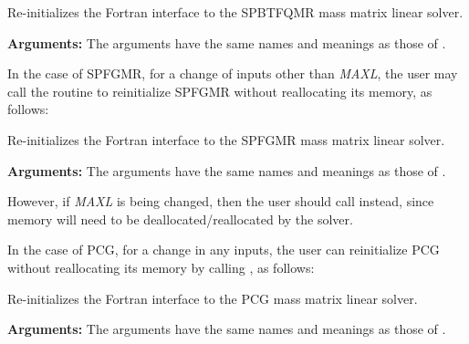 \documentclass[letterpaper,10pt,english]{sphinxmanual}
\begin{document}
\begin{fulllineitems}
\label{f_interface/Usage:f/_/FARKMASSSPTFQMRREINIT}
Re-initializes the Fortran interface to the SPBTFQMR mass matrix
linear solver.

\textbf{Arguments:}  The arguments have the same names and meanings as
those of {\hyperref[f_interface/Usage:f/_/FARKMASSSPTFQMR]{\emph{}}}.

\end{fulllineitems}


In the case of SPFGMR, for a change of inputs other than \emph{MAXL},
the user may call the routine {\hyperref[f_interface/Usage:f/_/FARKMASSSPFGMRREINIT]{\emph{}}} to
reinitialize SPFGMR without reallocating its memory, as follows:

\begin{fulllineitems}
\label{f_interface/Usage:f/_/FARKMASSSPFGMRREINIT}
Re-initializes the Fortran interface to the SPFGMR mass matrix
linear solver.

\textbf{Arguments:}  The arguments have the same names and meanings as
those of {\hyperref[f_interface/Usage:f/_/FARKMASSSPFGMR]{\emph{}}}.

\end{fulllineitems}


However, if \emph{MAXL} is being changed, then the user should call
{\hyperref[f_interface/Usage:f/_/FARKMASSSPFGMR]{\emph{}}} instead, since memory will need to be
deallocated/reallocated by the solver.

In the case of PCG, for a change in any inputs, the user can
reinitialize PCG without reallocating its memory by calling
{\hyperref[f_interface/Usage:f/_/FARKMASSPCGREINIT]{\emph{}}}, as follows:

\begin{fulllineitems}
\label{f_interface/Usage:f/_/FARKMASSPCGREINIT}
Re-initializes the Fortran interface to the PCG mass matrix
linear solver.

\textbf{Arguments:}  The arguments have the same names and meanings as
those of {\hyperref[f_interface/Usage:f/_/FARKMASSPCG]{\emph{}}}.

\end{fulllineitems}
\end{document}
